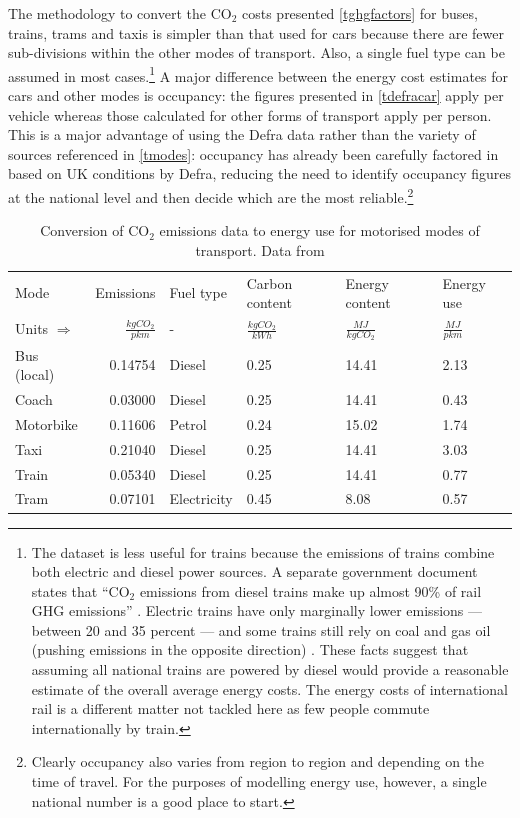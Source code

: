 \documentclass[a4paper, 11pt, twoside]{Thesis}
\begin{document}
The methodology to convert the CO$_2$ costs presented \cref{tghgfactors} for
buses, trains, trams and taxis is simpler
than that used for cars because there are fewer sub-divisions within the other
modes of transport.
Also, a single fuel type can be assumed in most cases.\footnote{The
dataset is less useful for trains because the emissions of trains combine
both electric and diesel power sources. A separate government document
states that ``CO$_2$
emissions from diesel trains make up almost 90\% of rail GHG emissions''
\citep[p.~13]{DfT2011-train90}. Electric trains have only marginally
lower emissions --- between 20 and 35 percent \citep{Hickman2012-trains} ---
and some trains still rely on coal and gas oil (pushing emissions in
the opposite direction) \citep{DfT2011-train90}. These facts suggest that
assuming all national trains are powered by diesel would provide a reasonable estimate
of the overall average energy costs.
The energy costs of international rail is a different matter not tackled here
as few people commute internationally by train.
}
A major difference between the energy cost estimates for cars and other
modes is occupancy: the figures presented in \cref{tdefracar} apply per vehicle
whereas those calculated for other forms of transport apply per person.
This is a major advantage of using the Defra data rather than the variety of
sources referenced in \cref{tmodes}: occupancy has already been carefully
factored in based on UK conditions by Defra, reducing the need to identify
occupancy figures at the national level and then decide which are the most
reliable.\footnote{Clearly
occupancy also varies from region to region and depending on the
time of travel. For the purposes of modelling energy use, however,
a single national number is a good place to start.
}

\begin{table}[htbp]
\caption[Emissions data and calculated energy use of motorised
modes]{Conversion of CO$_2$ emissions data to energy use for motorised
modes of transport. Data from \citep{Defra2011}}
\begin{center}
\begin{tabular}{lrlp{1.8cm}p{1.8cm}p{1.8cm}}
\toprule
Mode & Emissions & Fuel type & Carbon content & Energy content & Energy use \\
Units $\Rightarrow$ & $\frac{kg CO_2}{pkm}$ & - & $\frac{kg CO_2}{kWh}$ &$\frac{MJ}{kg CO_2}$ &
$\frac{MJ}{pkm}$ \\
\midrule
Bus (local) & 0.14754 & Diesel & 0.25 & 14.41 & 2.13 \\
Coach	& 0.03000 & Diesel &	0.25	& 14.41 &	0.43\\
Motorbike & 0.11606 & Petrol & 0.24 & 15.02 & 1.74 \\
Taxi & 0.21040 & Diesel & 0.25 & 14.41 & 3.03 \\
Train  & 0.05340 & Diesel & 0.25 & 14.41 & 0.77 \\
Tram & 0.07101 & Electricity  & 0.45 & 8.08 & 0.57 \\
\bottomrule
\end{tabular}\end{center}
\label{tdefra2}
\end{table}
\end{document}
